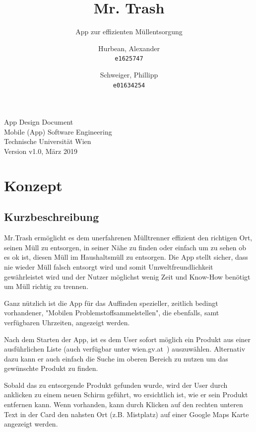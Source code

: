 \documentclass[a4paper]{scrreprt}
\title{Mr. Trash}
\subtitle{App zur effizienten Müllentsorgung}
\author{
    Hurbean, Alexander\\
    \texttt{e1625747}
    \and
    Schweiger, Phillipp\\
    \texttt{e01634254}}
\begin{document}
\maketitle

\null\vfill
\noindent
App Design Document\\ 
Mobile (App) Software Engineering\\
Technische Universität Wien\\
Version v1.0, März 2019\\
\newpage


\tableofcontents

\chapter{Konzept}

\section{Kurzbeschreibung}
Mr.Trash ermöglicht es dem unerfahrenen Mülltrenner effizient den richtigen Ort, seinen Müll zu entsorgen, in seiner Nähe zu finden oder einfach um zu sehen ob es ok ist, diesen Müll im Haushaltsmüll zu entsorgen. Die App stellt sicher, dass nie wieder Müll falsch entsorgt wird und somit Umweltfreundlichkeit gewährleistet wird und der Nutzer möglichst wenig Zeit und Know-How benötigt um Müll richtig zu trennen.

Ganz nützlich ist die App für das Auffinden spezieller, zeitlich bedingt vorhandener, "Mobilen Problemstoffsammelstellen", die ebenfalls, samt verfügbaren Uhrzeiten, angezeigt werden.

Nach dem Starten der App, ist es dem User sofort möglich ein Produkt aus einer ausführlichen Liste (auch verfügbar unter wien.gv.at~\cite{muelltrennabc}) auszuwählen. Alternativ dazu kann er auch einfach die Suche im oberen Bereich zu nutzen um das gewünschte Produkt zu finden.

Sobald das zu entsorgende Produkt gefunden wurde, wird der User durch anklicken zu einem neuen Schirm geführt, wo ersichtlich ist, wie er sein Produkt entfernen kann. Wenn vorhanden, kann durch Klicken auf den rechten unteren Text in der Card den nahsten Ort (z.B. Mistplatz) auf einer Google Maps Karte angezeigt werden.
\end{document}
